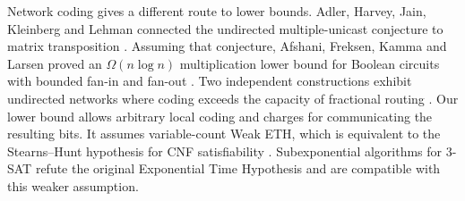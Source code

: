 Network coding gives a different route to lower bounds. Adler,
Harvey, Jain, Kleinberg and Lehman connected the undirected
multiple-unicast conjecture to matrix transposition
\cite{AHJ}. Assuming that conjecture, Afshani, Freksen, Kamma and
Larsen proved an $\Omega(n\log n)$ multiplication lower bound for
Boolean circuits with bounded fan-in and fan-out \cite{AFKL}.
Two independent constructions exhibit undirected networks where coding
exceeds the capacity of fractional routing \cite{ZhangLiLi,BravermanHe}. Our lower bound allows arbitrary local coding and charges for
communicating the resulting bits. It assumes variable-count Weak ETH,
which is equivalent to the Stearns--Hunt hypothesis for CNF satisfiability
\cite[Theorem~2.4]{WeakSH}. Subexponential algorithms for 3-SAT
\cite{Anthropic,falseeth} refute the original Exponential Time Hypothesis
\cite{IP} and are compatible with this weaker assumption.
